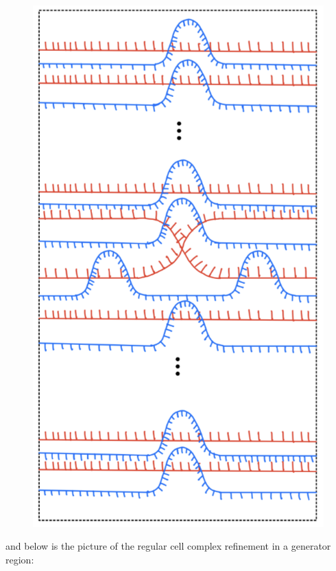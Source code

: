 \begin{definition}
\begin{figure}[H] 
    \centering
    \includegraphics[scale = 0.55]{diagrams/local_systems_on_as_diagrams/12.png} 
    \caption{}
    \label{fig:your-label}
\end{figure}

and below is the picture of the regular cell complex refinement in a generator region:


\end{definition}
